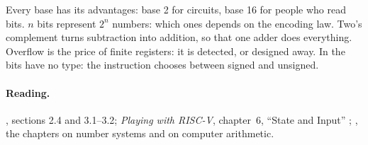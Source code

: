 Every base has its advantages: base 2 for circuits, base 16 for people who
read bits. $n$ bits represent $2^{n}$ numbers: which ones depends on the
encoding law. Two's complement turns subtraction into addition, so that one
adder does everything. Overflow is the price of finite registers: it is
detected, or designed away. In \riscv the bits have no type: the instruction
chooses between signed and unsigned.

\paragraph{Reading.} \citet{patterson2020}, sections 2.4 and 3.1--3.2;
\emph{Playing with RISC-V}, chapter~6, ``State and Input''
\citep{prg32textbook}; \citet{stallings2021}, the chapters on number systems
and on computer arithmetic.
